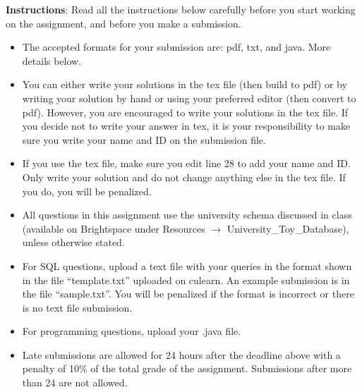 \documentclass[a4 paper]{article}
\begin{document}
\textbf{Instructions}: Read all the instructions below carefully before you start working on the assignment, and before you make a submission.
\begin{itemize}
    \item The accepted formats for your submission are: pdf, txt, and java. More details below. 
    \item You can either write your solutions in the tex file (then build to pdf) or by writing your solution by hand or using your preferred editor (then convert to pdf). However, you are encouraged to write your solutions in the tex file. If you decide not to write your answer in tex, it is your responsibility to make sure you write your name and ID on the submission file.
    \item If you use the tex file, make sure you edit line 28 to add your name and ID. Only write your solution and do not change anything else in the tex file. If you do, you will be penalized.
    \item All questions in this assignment use the university schema discussed in class (available on Brightspace under Resources $\rightarrow$ University\_Toy\_Database), unless otherwise stated.
    \item For SQL questions, upload a text file with your queries in the format shown in the file ``template.txt'' uploaded on culearn. An example submission is in the file ``sample.txt''. You will be penalized if the format is incorrect or there is no text file submission. 
    \item For programming questions, upload your .java file.
    \item Late submissions are allowed for 24 hours after the deadline above with a penalty of 10\% of the total grade of the assignment. Submissions after more than 24 are not allowed.
\end{itemize}
\end{document}

